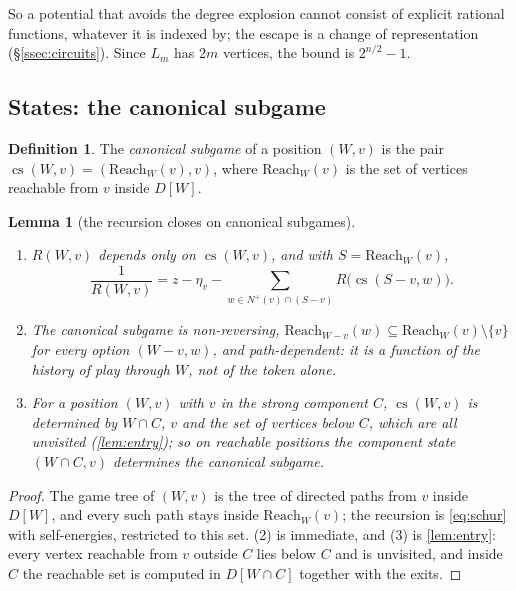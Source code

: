 \documentclass[11pt]{amsart}
\theoremstyle{plain}
\newtheorem{lemma}[theorem]{Lemma}
\theoremstyle{definition}
\newtheorem{definition}[theorem]{Definition}
\theoremstyle{remark}
\numberwithin{equation}{section}
\newcommand{\nplus}{N^{+}}
\begin{document}
So a potential that avoids the degree explosion cannot consist of explicit rational functions, whatever it is indexed by; the escape is a change of representation (\S\ref{ssec:circuits}). Since $L_m$ has $2m$ vertices, the bound is $2^{n/2}-1$.

\subsection{States: the canonical subgame}\label{ssec:canonical}

\begin{definition}\label{def:canonical}
The \emph{canonical subgame} of a position $(W,v)$ is the pair $\operatorname{cs}(W,v)=(\mathrm{Reach}_W(v),v)$, where $\mathrm{Reach}_W(v)$ is the set of vertices reachable from $v$ inside $D[W]$.
\end{definition}

\begin{lemma}[the recursion closes on canonical subgames]\label{lem:canonical}
\begin{enumerate}[label=\textup{(\arabic*)}]
\item $R(W,v)$ depends only on $\operatorname{cs}(W,v)$, and with $S=\mathrm{Reach}_W(v)$,
\[
\frac1{R(W,v)}=z-\eta_v-\sum_{w\in\nplus(v)\cap(S-v)}R\bigl(\operatorname{cs}(S-v,w)\bigr).
\]
\item The canonical subgame is non-reversing, $\mathrm{Reach}_{W-v}(w)\subseteq\mathrm{Reach}_W(v)\setminus\{v\}$ for every option $(W-v,w)$, and path-dependent: it is a function of the history of play through $W$, not of the token alone.
\item For a position $(W,v)$ with $v$ in the strong component $C$, $\operatorname{cs}(W,v)$ is determined by $W\cap C$, $v$ and the set of vertices below $C$, which are all unvisited \textup{(}\cref{lem:entry}\textup{)}; so on reachable positions the component state $(W\cap C,v)$ determines the canonical subgame.
\end{enumerate}
\end{lemma}
\begin{proof}
The game tree of $(W,v)$ is the tree of directed paths from $v$ inside $D[W]$, and every such path stays inside $\mathrm{Reach}_W(v)$; the recursion is \eqref{eq:schur} with self-energies, restricted to this set. (2) is immediate, and (3) is \cref{lem:entry}: every vertex reachable from $v$ outside $C$ lies below $C$ and is unvisited, and inside $C$ the reachable set is computed in $D[W\cap C]$ together with the exits.
\end{proof}
\end{document}
